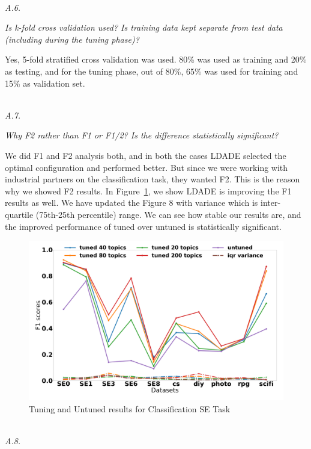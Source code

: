 \documentclass[conference]{IEEEtran}
\begin{document}
\noindent
\textit{\\A.6.} 

\textit{Is k-fold cross validation used?  Is training data kept separate from test data (including during the tuning phase)? \\}

Yes, 5-fold stratified cross validation was used. 80\% was used as training and 20\% as testing, and for the tuning phase, out of 80\%, 65\% was used for training and 15\% as validation set.

\noindent
\textit{\\A.7.}  

\textit{Why F2 rather than F1 or F1/2? Is the difference statistically significant? \\}

 We did F1 and F2 analysis both, and in both the cases LDADE selected the optimal configuration and performed better. But since we were working with industrial partners on the classification task, they wanted F2. This is the reason why we showed F2 results. In Figure~\ref{fig:f1}, we show LDADE is improving the F1 results as well. We have updated the Figure 8 with variance which is inter-quartile (75th-25th percentile) range. We can see how stable our results are, and the improved performance of tuned over untuned is statistically significant.

\begin{figure}[!htbp]
  \includegraphics[width=\linewidth]{./fig/F1.png}
  \caption{Tuning and Untuned results for Classification SE Task}
  \label{fig:f1}
\end{figure}

\noindent
\textit{\\A.8.}  
\end{document}
